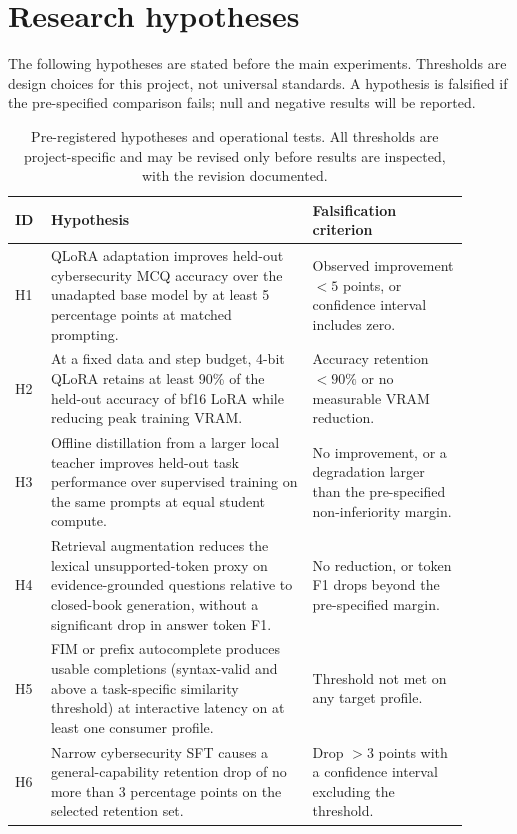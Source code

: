 \section{Research hypotheses}
\label{sec:hypotheses}

The following hypotheses are stated before the main experiments. Thresholds are
design choices for this project, not universal standards. A hypothesis is
falsified if the pre-specified comparison fails; null and negative results will
be reported.

\begin{table}[t]
\centering
\small
\caption{Pre-registered hypotheses and operational tests. All thresholds are
project-specific and may be revised only before results are inspected, with the
revision documented.}
\label{tab:hypotheses}
\begin{tabular}{@{}p{0.07\linewidth}p{0.52\linewidth}p{0.31\linewidth}@{}}
\toprule
ID & Hypothesis & Falsification criterion \\
\midrule
H1 & QLoRA adaptation improves held-out cybersecurity MCQ accuracy over the
unadapted base model by at least 5 percentage points at matched prompting. &
Observed improvement $<5$ points, or confidence interval includes zero. \\
H2 & At a fixed data and step budget, 4-bit QLoRA retains at least 90\% of the
held-out accuracy of bf16 LoRA while reducing peak training VRAM. &
Accuracy retention $<90\%$ or no measurable VRAM reduction. \\
H3 & Offline distillation from a larger local teacher improves held-out task
performance over supervised training on the same prompts at equal student
compute. & No improvement, or a degradation larger than the pre-specified
non-inferiority margin. \\
H4 & Retrieval augmentation reduces the lexical unsupported-token proxy on
evidence-grounded questions relative to closed-book generation, without a
significant drop in answer token F1. & No reduction, or token F1 drops beyond
the pre-specified margin. \\
H5 & FIM or prefix autocomplete produces usable completions (syntax-valid and
above a task-specific similarity threshold) at interactive latency on at least
one consumer profile. & Threshold not met on any target profile. \\
H6 & Narrow cybersecurity SFT causes a general-capability retention drop of no
more than 3 percentage points on the selected retention set. & Drop $>3$ points
with a confidence interval excluding the threshold. \\
\bottomrule
\end{tabular}
\end{table}

